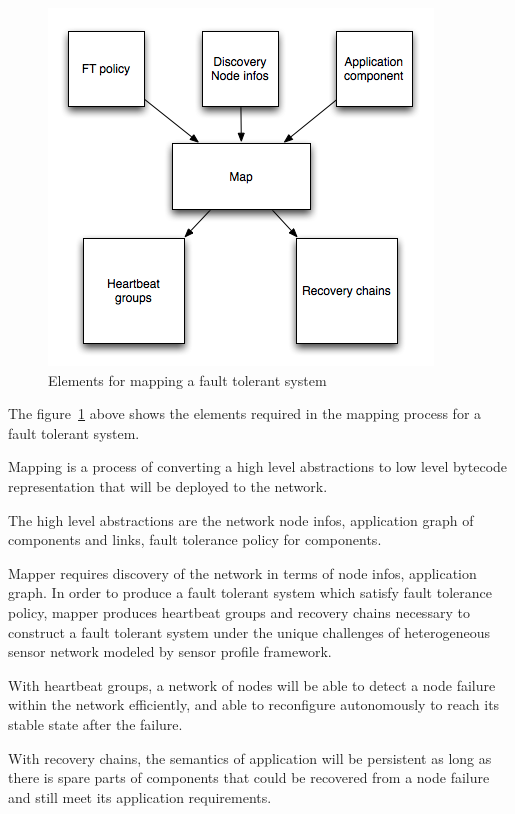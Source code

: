 \begin{figure}[h!]
\caption{Elements for mapping a fault tolerant system}
\label{fig:mapping-ft}
\centering
    \includegraphics[width=\linewidth]{figures/mapping-ft}
\end{figure}

The figure~\ref{fig:mapping-ft} above shows the elements required in the
mapping process for a fault tolerant system.

Mapping is a process of converting a high level abstractions to low level
bytecode representation that will be deployed to the network.

The high level abstractions are the network node infos, application graph of
components and links, fault tolerance policy for components.

Mapper requires discovery of the network in terms of node infos, application
graph. In order to produce a fault tolerant system which satisfy fault
tolerance policy, mapper produces heartbeat groups and recovery chains
necessary to construct a fault tolerant system under the unique challenges of
heterogeneous sensor network modeled by sensor profile framework.

With heartbeat groups, a network of nodes will be able to detect a node failure
within the network efficiently, and able to reconfigure autonomously to reach
its stable state after the failure.

With recovery chains, the semantics of application will be persistent as
long as there is spare parts of components that could be recovered from
a node failure and still meet its application requirements.

